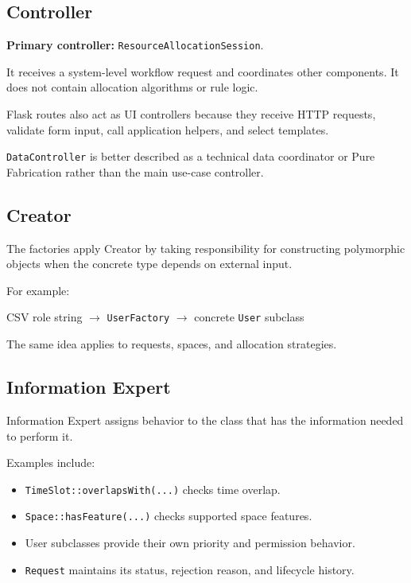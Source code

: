 \documentclass[12pt,a4paper]{article}
\begin{document}
\subsection{Controller}

\textbf{Primary controller:} \texttt{ResourceAllocationSession}.

It receives a system-level workflow request and coordinates other components.
It does not contain allocation algorithms or rule logic.

Flask routes also act as UI controllers because they receive HTTP requests,
validate form input, call application helpers, and select templates.

\texttt{DataController} is better described as a technical data coordinator
or Pure Fabrication rather than the main use-case controller.

\subsection{Creator}

The factories apply Creator by taking responsibility for constructing
polymorphic objects when the concrete type depends on external input.

For example:

\begin{center}
CSV role string
$\longrightarrow$
\texttt{UserFactory}
$\longrightarrow$
concrete \texttt{User} subclass
\end{center}

The same idea applies to requests, spaces, and allocation strategies.

\subsection{Information Expert}

Information Expert assigns behavior to the class that has the information
needed to perform it.

Examples include:

\begin{itemize}
    \item \texttt{TimeSlot::overlapsWith(...)} checks time overlap.
    \item \texttt{Space::hasFeature(...)} checks supported space features.
    \item User subclasses provide their own priority and permission behavior.
    \item \texttt{Request} maintains its status, rejection reason, and lifecycle history.
\end{itemize}
\end{document}
